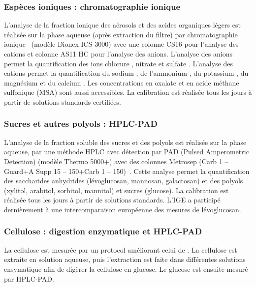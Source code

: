 \subsubsection{Espèces ioniques : chromatographie ionique}%
\label{ssub:espèces_ioniques_par_chromatographie}

L'analyse de la fraction ionique des aérosols et des acides organiques légers est réalisée
sur la phase aqueuse (après extraction du filtre) par chromatographie
ionique~\autocite{jaffrezoSeasonal2005,cenAmbient2017b} (modèle Dionex ICS 3000) avec une
colonne
CS16 pour l’analyse des cations et colonne AS11 HC pour l’analyse des anions. L’analyse
des anions permet la quantification des ions chlorure , nitrate  et
sulfate . L’analyse des cations permet la quantification du sodium , de
l'ammonium , du potassium , du magnésium  et du calcium
. 
Les concentrations en oxalate et en acide méthane sulfonique (MSA) sont aussi accessibles.
La calibration est réalisée tous les jours à partir de solutions standards certifiées.

\subsubsection{Sucres et autres polyols : HPLC-PAD}%
\label{ssub:sucres_et_autres_polyols_hplc-pad}

L’analyse de la fraction soluble des sucres et des polyols est réalisée sur la phase
aqueuse, par une méthode HPLC avec détection par PAD (Pulsed Amperometric Detection)
(modèle Thermo 5000+) avec des colonnes Metrosep (Carb 1 – Guard+A Supp 15 – 150+Carb
1 – 150)~\autocite{piotQuantification2012,wakedSource2014}.
Cette analyse permet la quantification des saccharides anhydrides (lévoglucosan,
mannosan, galactosan) et des polyols (xylitol, arabitol, sorbitol, mannitol) et sucres
(glucose). La calibration est réalisée tous les jours à partir de solutions standards.
L’IGE a participé dernièrement à une intercomparaison européenne des mesures de
lévoglucosan.

\subsubsection{Cellulose : digestion enzymatique et HPLC-PAD}%
\label{ssub:cellulose_}

La cellulose est mesurée par un protocol améliorant celui de \cite{kunitEnzymatic1996}.
La cellulose est extraite en solution aqueuse, puis l'extraction est faite dans
différentes solutions ensymatique afin de digèrer la cellulose en glucose. Le glucose est
ensuite mesuré par HPLC-PAD.

